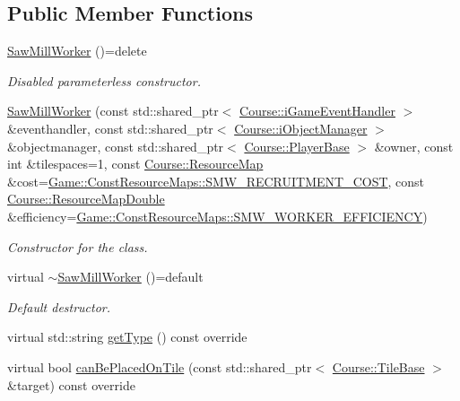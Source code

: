 \subsection*{Public Member Functions}
\begin{DoxyCompactItemize}
\item 
\hyperlink{classGame_1_1SawMillWorker_ae2d01dff4f059f5ab575d1b416764f52}{Saw\-Mill\-Worker} ()=delete
\begin{DoxyCompactList}\small\item\em Disabled parameterless constructor. \end{DoxyCompactList}\item 
\hyperlink{classGame_1_1SawMillWorker_adc9fe554404554f5051a7ed7b057bbc3}{Saw\-Mill\-Worker} (const std\-::shared\-\_\-ptr$<$ \hyperlink{classCourse_1_1iGameEventHandler}{Course\-::i\-Game\-Event\-Handler} $>$ \&eventhandler, const std\-::shared\-\_\-ptr$<$ \hyperlink{classCourse_1_1iObjectManager}{Course\-::i\-Object\-Manager} $>$ \&objectmanager, const std\-::shared\-\_\-ptr$<$ \hyperlink{classCourse_1_1PlayerBase}{Course\-::\-Player\-Base} $>$ \&owner, const int \&tilespaces=1, const \hyperlink{namespaceCourse_ab9a46ed9cd00485e318e5731ea2f78d9}{Course\-::\-Resource\-Map} \&cost=\hyperlink{namespaceGame_1_1ConstResourceMaps_aece4521104576e9af5ab8635b786c840}{Game\-::\-Const\-Resource\-Maps\-::\-S\-M\-W\-\_\-\-R\-E\-C\-R\-U\-I\-T\-M\-E\-N\-T\-\_\-\-C\-O\-S\-T}, const \hyperlink{namespaceCourse_a0b96bae1a664dde34efbb1b42dea615e}{Course\-::\-Resource\-Map\-Double} \&efficiency=\hyperlink{namespaceGame_1_1ConstResourceMaps_aa229959dcf7750d06878db7f5c4d0bae}{Game\-::\-Const\-Resource\-Maps\-::\-S\-M\-W\-\_\-\-W\-O\-R\-K\-E\-R\-\_\-\-E\-F\-F\-I\-C\-I\-E\-N\-C\-Y})
\begin{DoxyCompactList}\small\item\em Constructor for the class. \end{DoxyCompactList}\item 
virtual \hyperlink{classGame_1_1SawMillWorker_a3eff92aacde38a3ee5b27df21b75289b}{$\sim$\-Saw\-Mill\-Worker} ()=default
\begin{DoxyCompactList}\small\item\em Default destructor. \end{DoxyCompactList}\item 
virtual std\-::string \hyperlink{classGame_1_1SawMillWorker_af64ec6de521d31ec3fdc885a3bc69cba}{get\-Type} () const override
\item 
virtual bool \hyperlink{classGame_1_1SawMillWorker_a435e13b35d129a453d7fdfcd60b6dc42}{can\-Be\-Placed\-On\-Tile} (const std\-::shared\-\_\-ptr$<$ \hyperlink{classCourse_1_1TileBase}{Course\-::\-Tile\-Base} $>$ \&target) const override

\end{DoxyCompactItemize}
